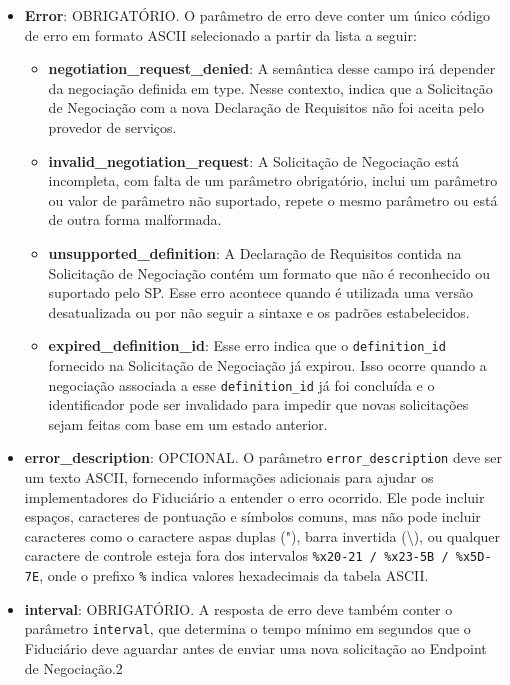 \begin{itemize}

    \item \textbf{Error}: OBRIGATÓRIO. O parâmetro de erro deve conter um único código de erro em formato ASCII selecionado a partir da lista a seguir:

    \begin{itemize}
    
        \item \textbf{negotiation\_request\_denied}: A semântica desse campo irá depender da negociação definida em type. Nesse contexto, indica que a Solicitação de Negociação com a nova Declaração de Requisitos não foi aceita pelo provedor de serviços.

        \item \textbf{invalid\_negotiation\_request}: A Solicitação de Negociação está incompleta, com falta de um parâmetro obrigatório, inclui um parâmetro ou valor de parâmetro não suportado, repete o mesmo parâmetro ou está de outra forma malformada.

        \item \textbf{unsupported\_definition}: A Declaração de Requisitos contida na Solicitação de Negociação contém um formato que não é reconhecido ou suportado pelo \acs{SP}. Esse erro acontece quando é utilizada uma versão desatualizada ou por não seguir a sintaxe e os padrões estabelecidos.

        \item \textbf{expired\_definition\_id}: Esse erro indica que o \texttt{definition\_id} fornecido na Solicitação de Negociação já expirou. Isso ocorre quando a negociação associada a esse \texttt{definition\_id} já foi concluída e o identificador pode ser invalidado para impedir que novas solicitações sejam feitas com base em um estado anterior.
        
    \end{itemize}

    \item \textbf{error\_description}: OPCIONAL. O parâmetro \texttt{error\_description} deve ser um texto ASCII, fornecendo informações adicionais para ajudar os implementadores do Fiduciário a entender o erro ocorrido. Ele pode incluir espaços, caracteres de pontuação e símbolos comuns, mas não pode incluir caracteres como o caractere aspas duplas ("), barra invertida (\textbackslash), ou qualquer caractere de controle esteja fora dos intervalos \texttt{\%x20-21 / \%x23-5B / \%x5D-7E}, onde o prefixo \texttt{\%} indica valores hexadecimais da tabela ASCII.

    \item \textbf{interval}: OBRIGATÓRIO. A resposta de erro deve também conter o parâmetro \texttt{interval}, que determina o tempo mínimo em segundos que o Fiduciário deve aguardar antes de enviar uma nova solicitação ao Endpoint de Negociação.2
    
\end{itemize}


